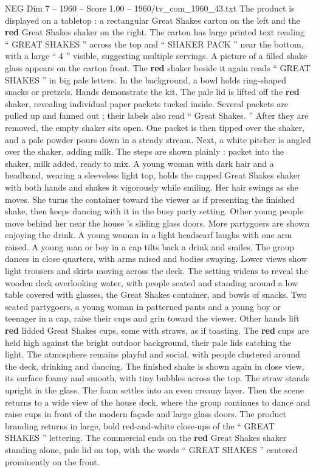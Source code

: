 \begin{textsample}{NEG Dim 7 – 1960 – Score 1.00 – 1960/tv\_com\_1960\_43.txt}
The product is displayed on a tabletop : a rectangular Great Shakes carton on the left and the \textbf{red} Great Shakes shaker on the right.
The carton has large printed text reading “ GREAT SHAKES ” across the top and “ SHAKER PACK ” near the bottom, with a large “ 4 ” visible, suggesting multiple servings.
A picture of a filled shake glass appears on the carton front.
The \textbf{red} shaker beside it again reads “ GREAT SHAKES ” in big pale letters.
In the background, a bowl holds ring-shaped snacks or pretzels.
Hands demonstrate the kit.
The pale lid is lifted off the \textbf{red} shaker, revealing individual paper packets tucked inside.
Several packets are pulled up and fanned out ; their labels also read “ Great Shakes. ” After they are removed, the empty shaker sits open.
One packet is then tipped over the shaker, and a pale powder pours down in a steady stream.
Next, a white pitcher is angled over the shaker, adding milk.
The steps are shown plainly : packet into the shaker, milk added, ready to mix.
A young woman with dark hair and a headband, wearing a sleeveless light top, holds the capped Great Shakes shaker with both hands and shakes it vigorously while smiling.
Her hair swings as she moves.
She turns the container toward the viewer as if presenting the finished shake, then keeps dancing with it in the busy party setting.
Other young people move behind her near the house ’s sliding glass doors.
More partygoers are shown enjoying the drink.
A young woman in a light headscarf laughs with one arm raised.
A young man or boy in a cap tilts back a drink and smiles.
The group dances in close quarters, with arms raised and bodies swaying.
Lower views show light trousers and skirts moving across the deck.
The setting widens to reveal the wooden deck overlooking water, with people seated and standing around a low table covered with glasses, the Great Shakes container, and bowls of snacks.
Two seated partygoers, a young woman in patterned pants and a young boy or teenager in a cap, raise their cups and grin toward the viewer.
Other hands lift \textbf{red} lidded Great Shakes cups, some with straws, as if toasting.
The \textbf{red} cups are held high against the bright outdoor background, their pale lids catching the light.
The atmosphere remains playful and social, with people clustered around the deck, drinking and dancing.
The finished shake is shown again in close view, its surface foamy and smooth, with tiny bubbles across the top.
The straw stands upright in the glass.
The foam settles into an even creamy layer.
Then the scene returns to a wide view of the house deck, where the group continues to dance and raise cups in front of the modern façade and large glass doors.
The product branding returns in large, bold red-and-white close-ups of the “ GREAT SHAKES ” lettering.
The commercial ends on the \textbf{red} Great Shakes shaker standing alone, pale lid on top, with the words “ GREAT SHAKES ” centered prominently on the front.

\end{textsample}
